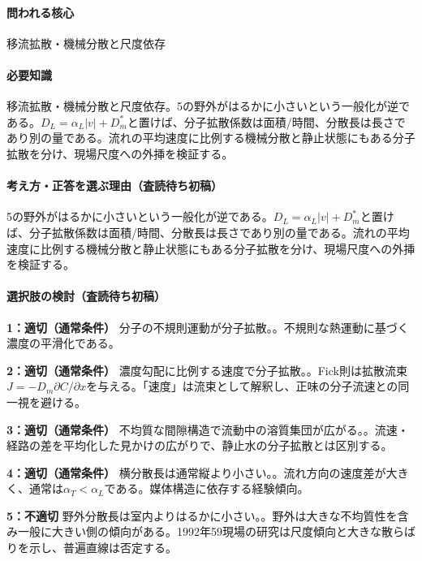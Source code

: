 \paragraph{問われる核心} 移流拡散・機械分散と尺度依存

\paragraph{必要知識} 移流拡散・機械分散と尺度依存。5の野外がはるかに小さいという一般化が逆である。\(D_L=\alpha_L|v|+D_m^\ast\)と置けば、分子拡散係数は面積/時間、分散長は長さであり別の量である。流れの平均速度に比例する機械分散と静止状態にもある分子拡散を分け、現場尺度への外挿を検証する。

\paragraph{考え方・正答を選ぶ理由（査読待ち初稿）} 5の野外がはるかに小さいという一般化が逆である。\(D_L=\alpha_L|v|+D_m^\ast\)と置けば、分子拡散係数は面積/時間、分散長は長さであり別の量である。流れの平均速度に比例する機械分散と静止状態にもある分子拡散を分け、現場尺度への外挿を検証する。

\paragraph{選択肢の検討（査読待ち初稿）}\mbox{}\par

\noindent\textbf{1：適切（通常条件）} 分子の不規則運動が分子拡散。。不規則な熱運動に基づく濃度の平滑化である。\par

\noindent\textbf{2：適切（通常条件）} 濃度勾配に比例する速度で分子拡散。。Fick則は拡散流束\(J=-D_m\partial C/\partial x\)を与える。「速度」は流束として解釈し、正味の分子流速との同一視を避ける。\par

\noindent\textbf{3：適切（通常条件）} 不均質な間隙構造で流動中の溶質集団が広がる。。流速・経路の差を平均化した見かけの広がりで、静止水の分子拡散とは区別する。\par

\noindent\textbf{4：適切（通常条件）} 横分散長は通常縦より小さい。。流れ方向の速度差が大きく、通常は\(\alpha_T<\alpha_L\)である。媒体構造に依存する経験傾向。\par

\noindent\textbf{5：不適切} 野外分散長は室内よりはるかに小さい。。野外は大きな不均質性を含み一般に大きい側の傾向がある。1992年59現場の研究は尺度傾向と大きな散らばりを示し、普遍直線は否定する。\par

